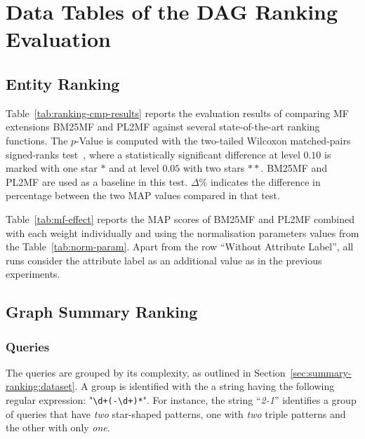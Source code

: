\chapter{Data Tables of the DAG Ranking Evaluation}

\section{Entity Ranking}

Table~\ref{tab:ranking-cmp-results} reports the evaluation results of comparing \gls{MF} extensions \gls{BM25MF} and \gls{PL2MF} against several state-of-the-art ranking functions. The $p$-Value is computed with the two-tailed Wilcoxon matched-pairs signed-ranks test~\cite{sheskin:2003:CRC,buttcher:2010:IRI:1869919}, where a statistically significant difference at level $0.10$ is marked with one star $*$ and at level $0.05$ with two stars $**$. \gls{BM25MF} and \gls{PL2MF} are used as a baseline in this test. $\Delta\%$ indicates the difference in percentage between the two MAP values compared in that test.




Table~\ref{tab:mf-effect} reports the MAP scores of \gls{BM25MF} and \gls{PL2MF} combined with each weight individually and using the normalisation parameters values from the Table~\ref{tab:norm-param}. Apart from the row ``Without Attribute Label'', all runs consider the attribute label as an additional value as in the previous experiments.



\section{Graph Summary Ranking}
\label{app:summary-ranking}

\subsection{Queries}

The queries are grouped by its complexity, as outlined in Section~\ref{sec:summary-ranking:dataset}. A group is identified with the a string having the following regular expression: "\verb/\d+(-\d+)*/". For instance, the string ``\emph{2-1}'' identifies a group of queries that have \textit{two} star-shaped patterns, one with \textit{two} triple patterns and the other with only \textit{one}.

